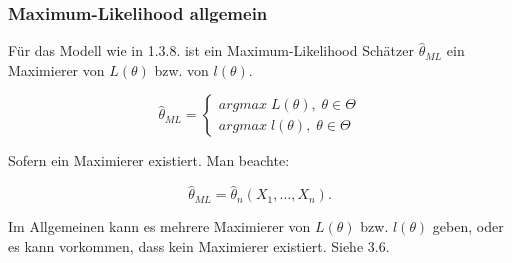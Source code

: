 \documentclass[10pt]{article}
\newcommand{\FZV}{X_1, \ldots, X_n} %
\begin{document}
	\subsubsection{Maximum-Likelihood allgemein}
	
	Für das Modell wie in 1.3.8. ist ein Maximum-Likelihood Schätzer $\hat{\theta}_{ML}$ ein Maximierer von $L(\theta)$ bzw. von $l(\theta)$. 
	
	\begin{equation*}
		\hat{\theta}_{ML} =
		\begin{cases}
			argmax \; L(\theta),\; \theta \in \Theta\\
			argmax \; l(\theta),\; \theta \in \Theta
		\end{cases}
	\end{equation*}
	
	Sofern ein Maximierer existiert. 
	Man beachte: 
	
	\begin{equation*}
		\hat{\theta}_{ML} = \hat{\theta}_n (\FZV).
	\end{equation*}
	
	Im Allgemeinen kann es mehrere Maximierer von $L(\theta)$ bzw. $l(\theta)$ geben, oder es kann vorkommen, dass kein Maximierer existiert. Siehe 3.6. 
	
\end{document}
